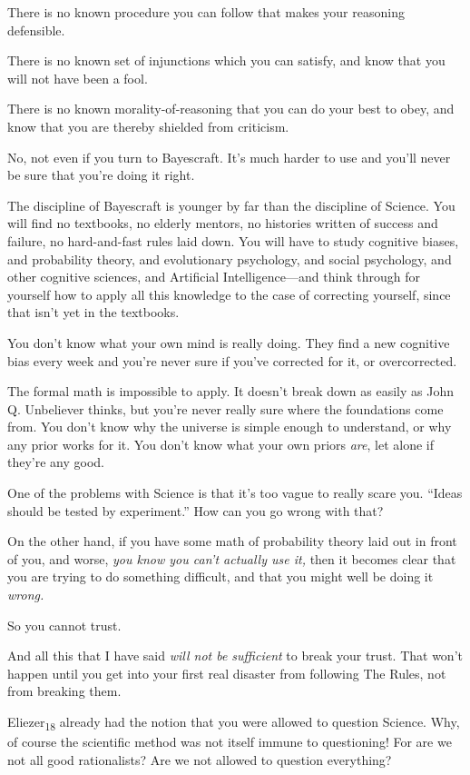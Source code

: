 {
 There is no known procedure you can follow that makes your
reasoning defensible.}

{
 There is no known set of injunctions which you can satisfy, and
know that you will not have been a fool.}

{
 There is no known morality-of-reasoning that you can do your best
to obey, and know that you are thereby shielded from criticism.}

{
 No, not even if you turn to Bayescraft. It's much
harder to use and you'll never be sure that
you're doing it right.}

{
 The discipline of Bayescraft is younger by far than the discipline
of Science. You will find no textbooks, no elderly mentors, no
histories written of success and failure, no hard-and-fast rules laid
down. You will have to study cognitive biases, and probability theory,
and evolutionary psychology, and social psychology, and other cognitive
sciences, and Artificial Intelligence---and think through for yourself
how to apply all this knowledge to the case of correcting yourself,
since that isn't yet in the textbooks.}

{
 You don't know what your own mind is really doing.
They find a new cognitive bias every week and you're
never sure if you've corrected for it, or
overcorrected.}

{
 The formal math is impossible to apply. It doesn't
break down as easily as John Q. Unbeliever thinks, but
you're never really sure where the foundations come
from. You don't know why the universe is simple enough
to understand, or why any prior works for it. You don't
know what your own priors \textit{are}, let alone if
they're any good.}

{
 One of the problems with Science is that it's too
vague to really scare you. ``Ideas should be tested by
experiment.'' How can you go wrong with that?}

{
 On the other hand, if you have some math of probability theory
laid out in front of you, and worse, \textit{you know you
can't actually use it,} then it becomes clear that you
are trying to do something difficult, and that you might well be doing
it \textit{wrong.}}

{
 So you cannot trust.}

{
 And all this that I have said \textit{will not be sufficient} to
break your trust. That won't happen until you get into
your first real disaster from following The Rules, not from breaking
them.}

{
 Eliezer\textsubscript{18} already had the notion that you were
allowed to question Science. Why, of course the scientific method was
not itself immune to questioning! For are we not all good rationalists?
Are we not allowed to question everything?}

